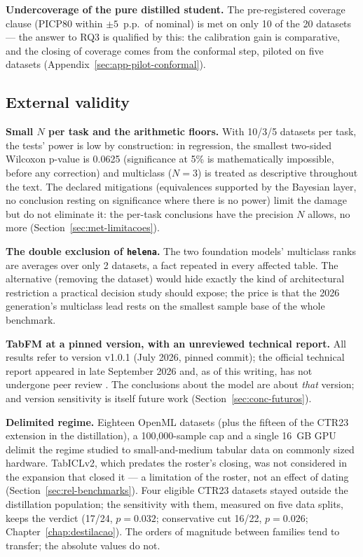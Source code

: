 \textbf{Undercoverage of the pure distilled student.} The
pre-registered coverage clause (PICP80 within $\pm5$~p.p.\ of
nominal) is met on only 10 of the 20 datasets --- the answer to RQ3
is qualified by this: the calibration gain is comparative, and the
closing of coverage comes from the conformal step, piloted on five
datasets (Appendix~\ref{sec:app-pilot-conformal}).

\subsection{External validity}

\textbf{Small $N$ per task and the arithmetic floors.} With 10/3/5
datasets per task, the tests' power is low by construction: in
regression, the smallest two-sided Wilcoxon p-value is 0.0625
(significance at 5\% is mathematically impossible, before any
correction) and multiclass ($N{=}3$) is treated as descriptive
throughout the text. The declared mitigations (equivalences
supported by the Bayesian layer, no conclusion resting on
significance where there is no power) limit the damage but do not
eliminate it: the per-task conclusions have the precision $N$
allows, no more (Section~\ref{sec:met-limitacoes}).

\textbf{The double exclusion of \texttt{helena}.} The two
foundation models' multiclass ranks are averages over only 2
datasets, a fact repeated in every affected table. The alternative
(removing the dataset) would hide exactly the kind of architectural
restriction a practical decision study should expose; the price is
that the 2026 generation's multiclass lead rests on the smallest
sample base of the whole benchmark.

\textbf{TabFM at a pinned version, with an unreviewed technical
report.} All results refer to version v1.0.1 (July 2026, pinned
commit); the official technical report \citep{kong2026} appeared in
late September 2026 and, as of this writing, has not undergone peer
review \citep{tabfm2026}. The conclusions about the model are about
\emph{that} version; and version sensitivity is itself future work
(Section~\ref{sec:conc-futuros}).

\textbf{Delimited regime.} Eighteen OpenML datasets (plus the
fifteen of the CTR23 extension in the distillation), a
100{,}000-sample cap and a single 16~GB GPU delimit the regime
studied to small-and-medium tabular data on commonly sized
hardware. TabICLv2, which predates the roster's closing, was not
considered in the expansion that closed it --- a limitation of the
roster, not an effect of dating
(Section~\ref{sec:rel-benchmarks}). Four eligible CTR23 datasets stayed outside the
distillation population; the sensitivity with them, measured on
five data splits, keeps the verdict (17/24, $p=0.032$; conservative
cut 16/22, $p=0.026$; Chapter~\ref{chap:destilacao}). The orders of
magnitude between families tend to transfer; the absolute values do
not.

